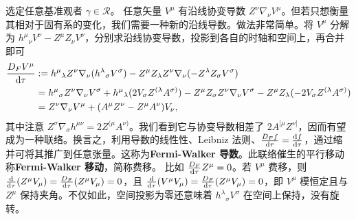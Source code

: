 选定任意基准观者 $\gamma\in\mathscr R$。
任意矢量 $V^\mu$ 有沿线协变导数 $Z^\nu\nabla_\nu V^\mu$。但若只想衡量其相对于固有系的变化，我们需要一种新的沿线导数。做法非常简单。将 $V^\mu$ 分解为 $h^\mu{}_\nu V^\nu- Z^\mu Z_\nu V^\nu$，分别求沿线协变导数，投影到各自的时轴和空间上，再合并即可
\begin{align}
    \frac{D_F V^\mu}{\dd\tau} &:= h^\mu{}_\lambda Z^\nu\nabla_\nu (h^\lambda{}_\sigma V^\sigma) -Z^\mu Z_\lambda Z^\nu\nabla_\nu ( -Z^\lambda Z_\sigma V^\sigma) \nonumber \\
    &= h^\mu{}_\sigma Z^\nu\nabla_\nu V^\sigma + h^\mu{}_\lambda (2 V_\sigma Z^{(\lambda} A^{\sigma)}) -Z^\mu Z_\sigma Z^\nu\nabla_\nu V^\sigma -Z^\mu Z_\lambda (-2 V_\sigma Z^{(\lambda} A^{\sigma)})\nonumber \\
    &= Z^\nu\nabla_\nu V^\mu + (A^\mu Z^\nu - Z^\mu A^\nu)V_\nu,
\end{align}
其中注意 $Z^\sigma\nabla_\sigma h^{\mu\nu} = 2 Z^{(\mu} A^{\nu)}$。我们看到它与协变导数相差了 $2 A^{[\mu} Z^{\nu]}$，因而有望成为一种联络。换言之，利用导数的线性性、Leibniz 法则、$\frac{D_F f}{\dd\tau}=\dv{f}{\tau}$，通过缩并可将其推广到任意张量。这称为\textbf{Fermi-Walker 导数}。此联络催生的平行移动称\textbf{Fermi-Walker 移动}，简称费移。
比如 $\frac{D_F}{\dd\tau}Z^\mu=0$。若 $V^\mu$ 费移，则 $\dv{\tau}(Z^\mu V_\mu)=\frac{D_F}{\dd\tau}(Z^\mu V_\mu)=0$，且 $\dv{\tau}(V^\mu V_\mu)=\frac{D_F}{\dd\tau}(Z^\mu V_\mu)=0$，即 $V^\mu$ 模恒定且与 $Z^\mu$ 保持夹角。不仅如此，空间投影为零还意味着 $h^\lambda{}_\sigma V^\sigma$ 在空间上保持，没有旋转。

